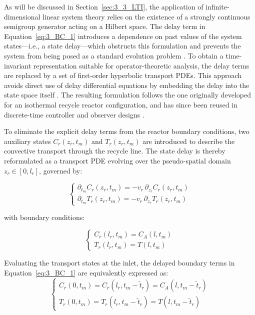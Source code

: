 As will be discussed in Section~\ref{sec:3_3_LTI}, the application of infinite-dimensional linear system theory relies on the existence of a strongly continuous semigroup generator acting on a Hilbert space. The delay term in Equation~\eqref{eq:3_BC_1} introduces a dependence on past values of the system states—i.e., a state delay—which obstructs this formulation and prevents the system from being posed as a standard evolution problem \autocite{Curtain2020Introduction}. To obtain a time-invariant representation suitable for operator-theoretic analysis, the delay terms are replaced by a set of first-order hyperbolic transport PDEs. This approach avoids direct use of delay differential equations by embedding the delay into the state space itself \autocite{Krstic2009Delay}. The resulting formulation follows the one originally developed for an isothermal recycle reactor configuration, and has since been reused in discrete-time controller and observer designs \autocite{Moadeli2025Optimal,Moadeli2025Model,Moadeli2025Observer}.

To eliminate the explicit delay terms from the reactor boundary conditions, two auxiliary states $C_r(z_r, t_m)$ and $T_r(z_r, t_m)$ are introduced to describe the convective transport through the recycle line. The state delay is thereby reformulated as a transport PDE evolving over the pseudo-spatial domain $z_r \in [0, l_r]$, governed by:

\begin{equation} \label{eq:3_transport_PDE}
    \begin{cases}
        \partial_{t_m} C_r(z_r, t_m) = - v_r \, \partial_{z_r} C_r(z_r, t_m) \\
        \partial_{t_m} T_r(z_r, t_m) = - v_r \, \partial_{z_r} T_r(z_r, t_m)
    \end{cases}
\end{equation}

with boundary conditions:

\begin{equation} \label{eq:3_transport_BC}
    \begin{cases}
        C_r(l_r, t_m) = C_{A}(l, t_m) \\
        T_r(l_r, t_m) = T(l, t_m)
    \end{cases}
\end{equation}

Evaluating the transport states at the inlet, the delayed boundary terms in Equation~\eqref{eq:3_BC_1} are equivalently expressed as:
\begin{equation} \label{eq:3_delay_identity}
    \begin{cases}
        C_r(0, t_m) = C_r(l_r, t_m - \tilde{t}_r) = C_{A}(l, t_m - \tilde{t}_r) \\
        T_r(0, t_m) = T_r(l_r, t_m - \tilde{t}_r) = T(l, t_m - \tilde{t}_r)
    \end{cases}
\end{equation}

